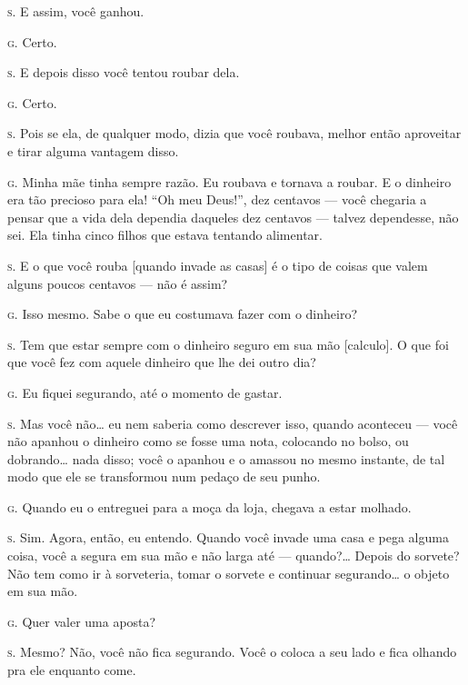 \noindent\hskip0mm\textsc{s.} E assim, você ganhou.

\noindent\hskip0mm\textsc{g.} Certo.

\noindent\hskip0mm\textsc{s.} E depois disso você tentou roubar dela.

\noindent\hskip0mm\textsc{g.} Certo.

\noindent\hskip0mm\textsc{s.} Pois se ela, de qualquer modo, dizia que você roubava, melhor então
aproveitar e tirar alguma vantagem disso.

\noindent\hskip0mm\textsc{g.} Minha mãe tinha sempre razão. Eu roubava e tornava a roubar. E o
dinheiro era tão precioso para ela! ``Oh meu
Deus!'', dez centavos --- você chegaria a pensar que a
vida dela dependia daqueles dez centavos --- talvez dependesse, não
sei. Ela tinha cinco filhos que estava tentando alimentar.

\noindent\hskip0mm\textsc{s.} E o que você rouba [quando invade as casas] é o tipo de coisas que
valem alguns poucos centavos --- não é assim?

\noindent\hskip0mm\textsc{g.} Isso mesmo. Sabe o que eu costumava fazer com o dinheiro?

\noindent\hskip0mm\textsc{s.} Tem que estar sempre com o dinheiro seguro em sua mão [calculo]. O
que foi que você fez com aquele dinheiro que lhe dei outro dia?

\noindent\hskip0mm\textsc{g.} Eu fiquei segurando, até o momento de gastar.

\noindent\hskip0mm\textsc{s.} Mas você não\ldots{} eu nem saberia como descrever isso, quando aconteceu
 --- você não apanhou o dinheiro como se fosse uma nota, colocando no
bolso, ou dobrando\ldots{} nada disso; você o apanhou e o amassou no mesmo
instante, de tal modo que ele se transformou num pedaço de seu punho.

\noindent\hskip0mm\textsc{g.} Quando eu o entreguei para a moça da loja, chegava a estar molhado.

\noindent\hskip0mm\textsc{s.} Sim. Agora, então, eu entendo. Quando você invade uma casa e pega
alguma coisa, você a segura em sua mão e não larga até --- quando?\ldots{}
Depois do sorvete? Não tem como ir à sorveteria, tomar o sorvete e
continuar segurando\ldots{} o objeto em sua mão.

\noindent\hskip0mm\textsc{g.} Quer valer uma aposta?

\noindent\hskip0mm\textsc{s.} Mesmo? Não, você não fica segurando. Você o coloca a seu lado e fica
olhando pra ele enquanto come.

